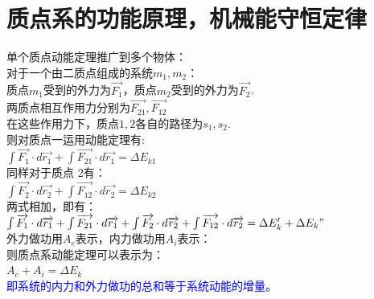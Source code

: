 	\section{质点系的功能原理，机械能守恒定律}


	\begin{theorem}[质点系的动能原理]
		单个质点动能定理推广到多个物体：\\
		对于一个由二质点组成的系统$m_1,m_2$：\\
		质点$m_1$受到的外力为$\overrightarrow{ F_1}$，质点$m_2$受到的外力为$\overrightarrow{ F_2}$.\\
		两质点相互作用力分别为$\overrightarrow{F_{21}}, \overrightarrow{F_{12}}$\\
		在这些作用力下，质点$1,2$各自的路径为$s_1,s_2$.\\
		则对质点一运用动能定理有:\\
		\centering$\int \overrightarrow{F_1} \cdot  {d }\overrightarrow{r_1}+\int \overrightarrow{F_{21}} \cdot  {d }\overrightarrow{r_1}=\Delta E_{k1} $\\
		同样对于质点 $2$有：\\
		$\int \overrightarrow{F_2} \cdot  {d }\overrightarrow{r_2}+\int \overrightarrow{F_{12}} \cdot  {d }\overrightarrow{r_2}=\Delta E_{k2} $\\
		两式相加，即有：\\
		$\int \overrightarrow{F_1} \cdot  {d }\overrightarrow{r_1}+\int \overrightarrow{F_{21}} \cdot  {d }\overrightarrow{r_1}+\int \overrightarrow{F_2} \cdot  {d }\overrightarrow{r_2}+\int \overrightarrow{F_{12}} \cdot  {d }\overrightarrow{r_2}=\Delta E_k'+\Delta E_k" $\\
		外力做功用$A_e$表示，内力做功用$A_i$表示：\\
		则质点系动能定理可以表示为：\\
		$A_e+A_i=\Delta E_k$\\
		\textcolor{blue}{\kaishu 即系统的内力和外力做功的总和等于系统动能的增量。}\\
	\end{theorem}
	
